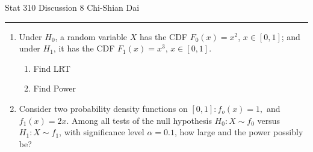 \documentclass[12pt]{article}
\begin{document}
	\noindent Stat 310 \hfill  Discussion 8 \hfill Chi-Shian Dai
\smallskip
	\hrule
\begin{enumerate}

\item  Under $H_0$, a random variable $X$ has the CDF $F_0(x)=x^2$, $x\in [0,1]$; and under $H_1$, it has the CDF $F_1(x)=x^3$,  $x\in [0,1]$.
\begin{enumerate}
	\item Find LRT
	\item Find Power
\end{enumerate}
\vspace{8 cm}
\item Consider two probability density functions on $[0,1]: f_o(x)=1,$ and $f_1(x)=2x$. Among all tests of the null hypothesis $H_0: X\sim f_0$ versus $H_1: X \sim f_1$, with significance level $\alpha=0.1$, how large and the power possibly be?
\end{enumerate}
\end{document}
